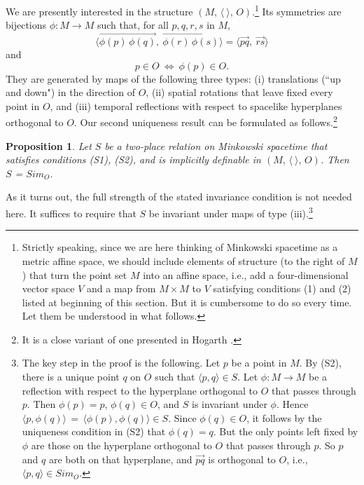 \documentclass [12] {article}
\theoremstyle{plain}
\newtheorem{proposition}{Proposition}[subsection]
\numberwithin{figure}{subsection}
\numberwithin{proposition}{subsection}
\begin{document}
We are presently interested in the structure  $(M, \,   \langle \  \rangle, \,  O)$.\footnote{Strictly speaking,  since we are here thinking of Minkowski spacetime as a metric affine space,  we should  include elements of structure (to the right of $M$) that turn the point set $M$ into an affine space, i.e., add a four-dimensional vector space $V$ and a map from $M \times M$ to $V$ satisfying conditions (1) and (2) listed at beginning of this section. But it is cumbersome to do so every time. Let them be understood in what follows.}  Its symmetries are bijections  $\phi:M \rightarrow M$ such that,  for all $p, q, r, s$ in $M$, 
\begin{equation}
\langle  \overrightarrow{\phi(p) \, \phi(q)}, \ \overrightarrow{\phi(r) \, \phi(s)}   \rangle = \langle \overrightarrow{pq}, \ \overrightarrow{rs}   \rangle
\end{equation} 
and
\begin{equation}
p \in O  \ \Longleftrightarrow \ \phi(p) \in O. 
\end{equation} 
 They are generated by maps of the following three types:  (i) translations (``up and down")  in the direction of $O$, (ii) spatial rotations that leave fixed every point in $O$, and  (iii) temporal reflections with respect to spacelike hyperplanes orthogonal to $O$. Our second uniqueness result can be formulated as follows.\footnote{It is a close variant of one presented in Hogarth .} 
%
\begin{proposition} \label{1st-S-uniqueness} 
Let $S$ be a two-place relation on Minkowski spacetime that satisfies conditions (S1), (S2), and is implicitly definable in $(M, \,   \langle \  \rangle, \,  O)$. Then $S$ = $Sim_O$.
\end{proposition}
As it turns out, the full strength of the stated  invariance condition is not needed here.  It suffices to require that $S$ be invariant under maps of type (iii).\footnote{The key step in the proof is the following.  Let $p$  be a point in $M$. By (S2), there is a unique point $q$ on $O$ such that $\langle p, q \rangle \in S$. Let $\phi: M \rightarrow M$  be a reflection with respect to the hyperplane orthogonal to $O$ that passes through $p$.  Then $\phi(p) = p$, $\phi(q) \in O$, and $S$ is invariant under $\phi$.  Hence\ $ \langle p, \phi(q) \rangle  \, = \,  \langle \phi(p), \phi(q) \rangle \in S$.  Since $\phi(q) \in O$, it follows by the uniqueness condition in (S2) that $\phi(q) = q$. But the only points left fixed by $\phi$ are those on the  hyperplane orthogonal to $O$ that passes through $p$. So $p$ and $q$ are both on that hyperplane, and  $\overrightarrow{pq}$ is  orthogonal to $O$, i.e.,  $\langle p, q \rangle \in Sim_O.$}
\end{document}
